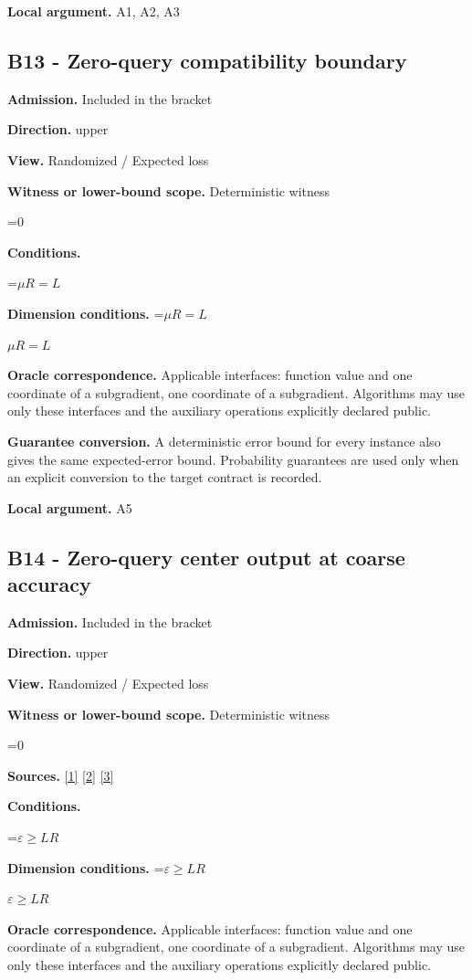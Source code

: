 \documentclass[10pt,a4paper]{article}
\newcommand{\AtlasMath}[1]{\par\begingroup\centering\setbox0=\hbox{$\displaystyle #1$}\ifdim\wd0>1.4\linewidth\typeout{ATLAS WIDE FORMULA: \the\wd0}\fi\ifdim\wd0>\linewidth\resizebox{\linewidth}{!}{\box0}\else\box0\fi\par\endgroup}
\newcommand{\AtlasInlineMath}[1]{\begingroup\setbox0=\hbox{$#1$}\ifdim\wd0>.4\linewidth\endgroup\AtlasMath{#1}\else\endgroup$#1$\fi}
\begin{document}
\textbf{Local argument.} A1, A2, A3

\subsection{B13 - Zero-query compatibility boundary}
\textbf{Admission.} Included in the bracket

\textbf{Direction.} upper

\textbf{View.} Randomized / Expected loss

\textbf{Witness or lower-bound scope.} Deterministic witness

\AtlasMath{0}
\textbf{Conditions.} 
\AtlasMath{\mu R=L}


\textbf{Dimension conditions.} \AtlasInlineMath{\mu R=L}

\textbf{Oracle correspondence.} Applicable interfaces: function value and one coordinate of a subgradient, one coordinate of a subgradient. Algorithms may use only these interfaces and the auxiliary operations explicitly declared public.

\textbf{Guarantee conversion.} A deterministic error bound for every instance also gives the same expected-error bound. Probability guarantees are used only when an explicit conversion to the target contract is recorded.

\textbf{Local argument.} A5

\subsection{B14 - Zero-query center output at coarse accuracy}
\textbf{Admission.} Included in the bracket

\textbf{Direction.} upper

\textbf{View.} Randomized / Expected loss

\textbf{Witness or lower-bound scope.} Deterministic witness

\AtlasMath{0}
\textbf{Sources.} \href{https://arxiv.org/pdf/1405.4980}{[1]} \href{https://www2.isye.gatech.edu/~nemirovs/MOR_AccuracyCertificates.pdf}{[2]} \href{https://arxiv.org/pdf/2609.20701}{[3]}

\textbf{Conditions.} 
\AtlasMath{\varepsilon\ge LR}


\textbf{Dimension conditions.} \AtlasInlineMath{\varepsilon\ge LR}

\textbf{Oracle correspondence.} Applicable interfaces: function value and one coordinate of a subgradient, one coordinate of a subgradient. Algorithms may use only these interfaces and the auxiliary operations explicitly declared public.
\end{document}
